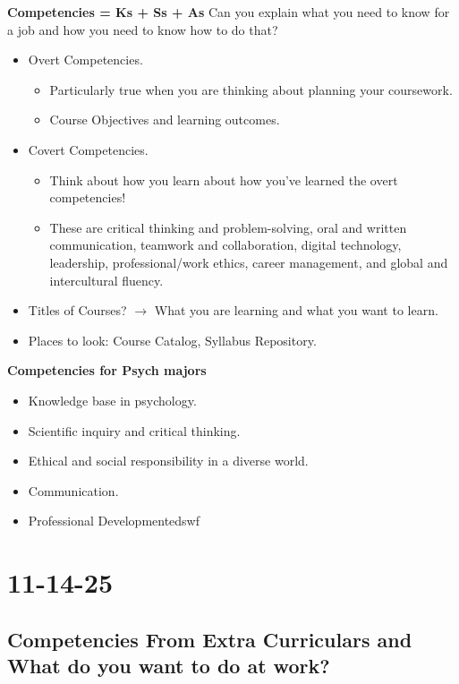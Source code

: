 \documentclass{report}
\begin{document}
\noindent \textbf{Competencies = Ks + Ss + As}
\newline
Can you explain what you need to know for a job and how you need to know how to do that? 
\begin{itemize}
    \item Overt Competencies. 
    \begin{itemize}
        \item Particularly true when you are thinking about planning your coursework.
        \item Course Objectives and learning outcomes.
    \end{itemize}
    \item Covert Competencies.
    \begin{itemize}
        \item Think about how you learn about how you've learned the overt competencies!
        \item These are critical thinking and problem-solving, oral and written communication, teamwork and collaboration, digital technology, leadership, professional/work ethics, career management, and global and intercultural fluency.
    \end{itemize}
    \item Titles of Courses? $\rightarrow$ What you are learning and what you want to learn.
    \item Places to look: Course Catalog, Syllabus Repository.
\end{itemize}

\textbf{Competencies for Psych majors}
\begin{itemize}
    \item Knowledge base in psychology.
    \item Scientific inquiry and critical thinking.
    \item Ethical and social responsibility in a diverse world.
    \item Communication.
    \item Professional Developmentedswf
\end{itemize}

\section{11-14-25}

\subsection{Competencies From Extra Curriculars and What do you want to do at work? }
 
\end{document}
